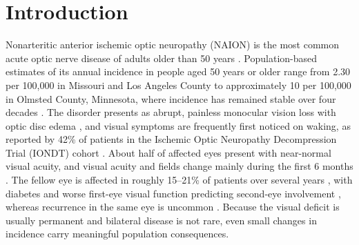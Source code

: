 \documentclass[journal]{IEEEtran}
\begin{document}
\section{Introduction}\label{introduction}

Nonarteritic anterior ischemic optic neuropathy (NAION) is the most
common acute optic nerve disease of adults older than 50 years
\cite{p9186104}. Population-based estimates of its annual incidence in
people aged 50 years or older range from 2.30 per 100,000 in Missouri
and Los Angeles County \cite{p8032479} to approximately 10 per 100,000
in Olmsted County, Minnesota, where incidence has remained stable over
four decades \cite{p9186104, p38358828}. The disorder presents as
abrupt, painless monocular vision loss with optic disc edema
\cite{p37987292}, and visual symptoms are frequently first noticed on
waking, as reported by 42\% of patients in the Ischemic Optic Neuropathy
Decompression Trial (IONDT) cohort \cite{p8906027}. About half of
affected eyes present with near-normal visual acuity, and visual acuity
and fields change mainly during the first 6 months \cite{p17698200}.
The fellow eye is affected in roughly 15--21\% of patients over several
years \cite{p12208242, p38358828}, with diabetes and worse first-eye
visual function predicting second-eye involvement
\cite{p12208242, p36502803}, whereas recurrence in the same eye is
uncommon \cite{p11704035}. Because the visual deficit is usually
permanent and bilateral disease is not rare, even small changes in
incidence carry meaningful population consequences.
\end{document}
